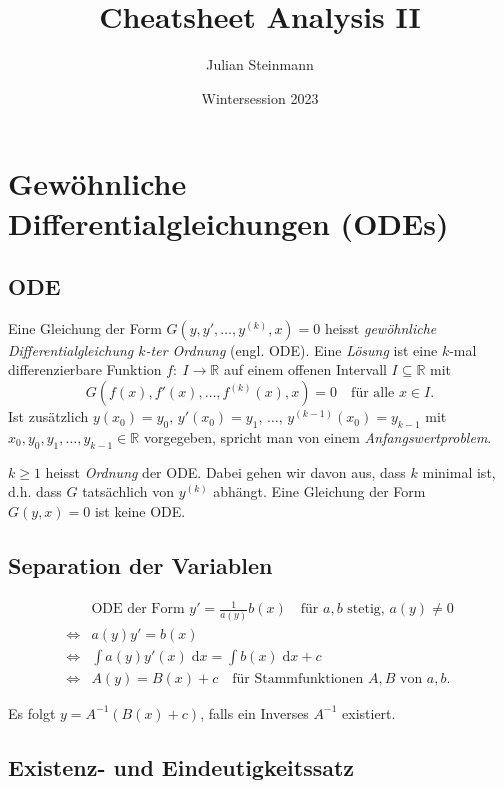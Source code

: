 \documentclass[a4paper,10pt]{article}
\title{Cheatsheet Analysis II}
\author{Julian Steinmann}
\date{Wintersession 2023}
\def\R{\mathbb{R}}
\def\dx{\; \mathrm{d}x}
\begin{document}
\section{Gewöhnliche Differentialgleichungen (ODEs)}

\subsection{ODE}

\begin{mainbox}{}
    Eine Gleichung der Form \( G(y, y', \dots, y^{(k)}, x) = 0 \) heisst \emph{gewöhnliche Differentialgleichung \( k \)-ter Ordnung} (engl. ODE). Eine \emph{Lösung} ist eine \( k \)-mal differenzierbare Funktion \( f: \: I \to \R \) auf einem offenen Intervall \( I \subseteq \R \) mit
    \[ G(f(x), f'(x), \dots, f^{(k)}(x), x) = 0 \quad \text{für alle \(x \in I\).} \]
    Ist zusätzlich \( {y(x_0) = y_0}, \, {y'(x_0) = y_1}, \, \dots, \, {y^{(k - 1)}(x_0) = y_{k - 1}} \) mit \( x_0, y_0, y_1, \dots, y_{k - 1} \in \R \) vorgegeben, spricht man von einem \emph{Anfangswertproblem}.
\end{mainbox}

\( k \geq 1 \) heisst \emph{Ordnung} der ODE. Dabei gehen wir davon aus, dass \( k \) minimal ist, d.h. dass \( G \) tatsächlich von \( y^{(k)} \) abhängt. Eine Gleichung der Form \( G(y, x) = 0 \) ist keine ODE.


\subsection{Separation der Variablen}

\begin{align*}
    &\text{ODE der Form } y' = \frac{1}{a(y)} b(x) \quad \text{für \(a, b\) stetig, \(a(y) \neq 0\)} \\
    \iff & a(y) y' = b(x) \\
    \iff & \int a(y) y'(x) \dx = \int b(x) \dx + c \\
    \iff & A(y) = B(x) + c \quad \text{für Stammfunktionen \(A, B\) von \(a, b\).}
\end{align*}

Es folgt \( y = A^{-1}(B(x) + c) \), falls ein Inverses \( A^{-1} \) existiert.


\subsection{Existenz- und Eindeutigkeitssatz}
\end{document}
